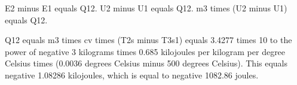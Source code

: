 E2 minus E1 equals Q12.
U2 minus U1 equals Q12.
m3 times (U2 minus U1) equals Q12.

Q12 equals m3 times cv times (T2s minus T3s1) equals 3.4277 times 10 to the power of negative 3 kilograms times 0.685 kilojoules per kilogram per degree Celsius times (0.0036 degrees Celsius minus 500 degrees Celsius).
This equals negative 1.08286 kilojoules, which is equal to negative 1082.86 joules.
